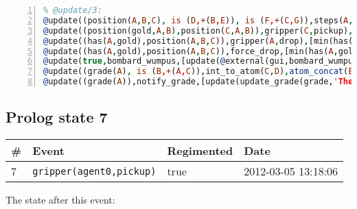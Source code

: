 \documentclass[11pt]{article}\usepackage[utf8]{inputenc}\usepackage{geometry}
\begin{document}
\begin{lstlisting}[language=Prolog, numbers=left]
% Rules with string id: @update
% @update/3:
@update((position(A,B,C), is (D,+(B,E)), is (F,+(C,G)),steps(A,H), is (I,+(H,1.0))),move(A,E,G),[min(position(A,B,C)),plus(position(A,D,F)),min(steps(A,H)),plus(steps(A,I))|[]])
@update((position(gold,A,B),position(C,A,B)),gripper(C,pickup),[plus(has(C,gold)),min(position(gold,A,B))|[]])
@update((has(A,gold),position(A,B,C)),gripper(A,drop),[min(has(A,gold)),plus(position(gold,B,C))|[]])
@update((has(A,gold),position(A,B,C)),force_drop,[min(has(A,gold)),plus(position(gold,B,C)),update(@external(gui,gripper,D))|[]])
@update(true,bombard_wumpus,[update(@external(gui,bombard_wumpus,A)),min(alive(wumpus))|[]])
@update((grade(A), is (B,+(A,C)),int_to_atom(C,D),atom_concat(E,D,F)),update_grade(G,E,C),[min(grade(A)),plus(grade(B)),update(@external(gui,show_notice(G,F),H))|[]])
@update((grade(A)),notify_grade,[update(update_grade(grade,'The end result: ',A))|[]])

\end{lstlisting}
\clearpage 
\subsection{Prolog state 7}
\begin{table}[ht]
\centering 
\begin{tabular}{l l l l} 
\textbf{\#} & \textbf{Event} & \textbf{Regimented} & \textbf{Date} \\ [0.5ex] 
\hline
7&\texttt{gripper(agent0,pickup)}&true&2012-03-05 13:18:06\\ [1ex] \hline\end{tabular}
\end{table}
The state after this event:
\end{document}
